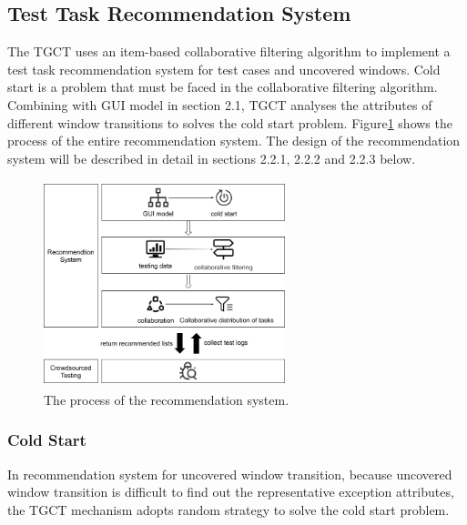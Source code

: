 \subsection{Test Task Recommendation System}
The TGCT uses an item-based collaborative filtering algorithm to implement a test task recommendation system for test cases and uncovered windows. Cold start is a problem that must be faced in the collaborative filtering algorithm. Combining with GUI model in section 2.1, TGCT analyses the attributes of different window transitions to solves the cold start problem. Figure\ref{fig:recomd} shows the process of the entire recommendation system. The design of the recommendation system will be described in detail in sections 2.2.1, 2.2.2 and 2.2.3 below.
\begin{figure}[htbp]
\centering
\centerline{\includegraphics[width=7cm,height=6cm]{fig/7.png}}
\caption{The process of the recommendation system.}
\label{fig:recomd}
\end{figure}
\subsubsection{Cold Start}
In recommendation system for uncovered window transition, because uncovered window transition is difficult to find out the representative exception attributes, the TGCT mechanism adopts random strategy to solve the cold start problem. 


